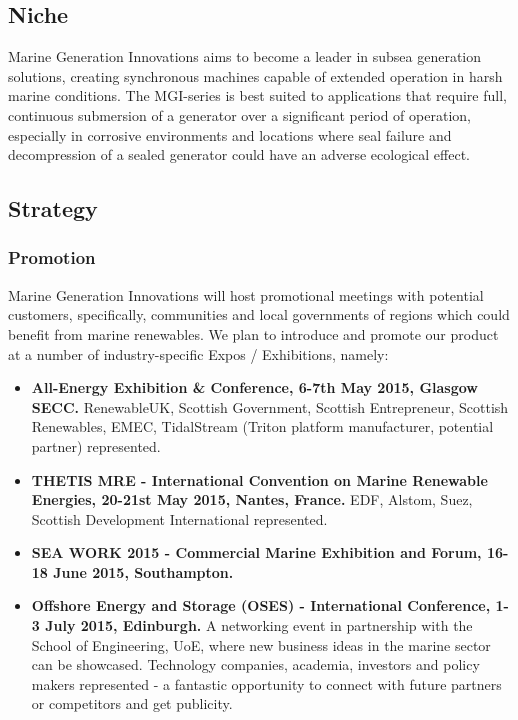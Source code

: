 \documentclass[a4paper,11pt]{article}
\begin{document}
\subsection{Niche}
Marine Generation Innovations aims to become a leader in subsea generation solutions, creating synchronous machines capable of extended operation in harsh marine conditions. The MGI-series is best suited to applications that require full, continuous submersion of a generator over a significant period of operation, especially in corrosive environments and locations where seal failure and decompression of a sealed generator could have an adverse ecological effect.

\subsection{Strategy}

\subsubsection{Promotion}
Marine Generation Innovations will host promotional meetings with potential customers, specifically, communities and local governments of regions which could benefit from marine renewables. We plan to introduce and promote our product at a number of industry-specific Expos / Exhibitions, namely:

\begin{itemize}
	\item \textbf{All-Energy Exhibition \& Conference, 6-7th May 2015, Glasgow SECC.}\cite{d11} RenewableUK, Scottish Government, Scottish Entrepreneur, Scottish Renewables, EMEC, TidalStream (Triton platform manufacturer, potential partner) represented.
	\item \textbf{THETIS MRE - International Convention on Marine Renewable Energies, 20-21st May 2015, Nantes, France.}\cite{d12} EDF, Alstom, Suez, Scottish Development International represented.
	\item \textbf{SEA WORK 2015 - Commercial Marine Exhibition and Forum, 16-18 June 2015, Southampton.}\cite{d13}
	\item \textbf{Offshore Energy and Storage (OSES) - International Conference, 1-3 July 2015, Edinburgh.}\cite{d14} A networking event in partnership with the School of Engineering, UoE, where new business ideas in the marine sector can be showcased. Technology companies, academia, investors and policy makers represented - a fantastic opportunity to connect with future partners or competitors and get publicity.
\end{itemize}
\end{document}
